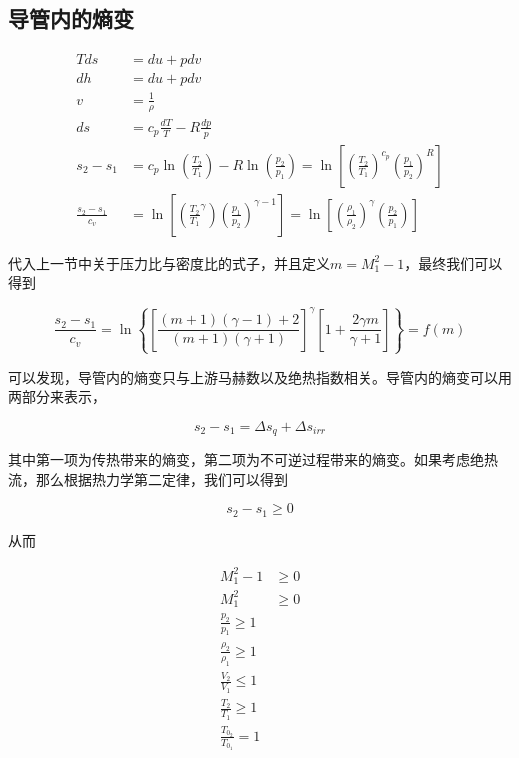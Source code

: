 \subsection{导管内的熵变}

\begin{align*}
    Tds&=du+pdv\\ 
    dh&=du+pdv\\ 
    v&=\frac{1}{\rho}\\ 
    ds&=c_p\frac{dT}{T}-R\frac{dp}{p}\\ 
    s_2-s_1&=c_p\ln\left(\frac{T_2}{T_1}\right)-R\ln\left(\frac{p_2}{p_1}\right)=\ln\left[\left(\frac{T_2}{T_1}\right)^{c_p}\left(\frac{p_1}{p_2}\right)^R\right]\\ 
    \frac{s_2-s_1}{c_v}&=\ln\left[\left(\frac{T_2}{T_1}^\gamma\right)\left(\frac{p_1}{p_2}\right)^{\gamma-1}\right]=\ln\left[\left(\frac{\rho_1}{\rho_2}\right)^\gamma\left(\frac{p_2}{p_1}\right)\right]
\end{align*}

代入上一节中关于压力比与密度比的式子，并且定义$m=M_1^2-1$，最终我们可以得到

\begin{equation*}
    \frac{s_{2}-s_{1}}{c_{v}}=\ln \left\{\left[\frac{(m+1)(\gamma-1)+2}{(m+1)(\gamma+1)}\right]^{\gamma}\left[1+\frac{2 \gamma m}{\gamma+1}\right]\right\}=f(m)
\end{equation*}

可以发现，导管内的熵变只与上游马赫数以及绝热指数相关。导管内的熵变可以用两部分来表示，

\begin{equation*}
    s_2-s_1=\Delta s_q+\Delta s_{irr}
\end{equation*}

其中第一项为传热带来的熵变，第二项为不可逆过程带来的熵变。如果考虑绝热流，那么根据热力学第二定律，我们可以得到

\begin{equation*}
    s_2-s_1\geq 0
\end{equation*}

从而

\begin{align*}
    M_1^2-1&\geq 0\\ 
    M_1^2&\geq 0\\ 
    \frac{p_{2}}{p_{1}} \geq 1\\ 
    \frac{\rho_{2}}{\rho_{1}} \geq 1\\ 
    \frac{V_{2}}{V_{1}} \leq 1\\ 
    \frac{T_{2}}{T_{1}} \geq 1\\ 
    \frac{T_{0_{2}}}{T_{0_{1}}}=1
\end{align*}

